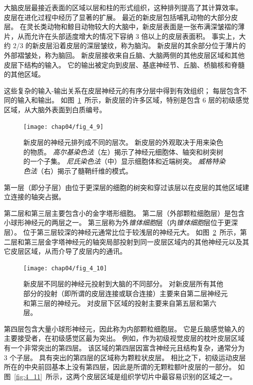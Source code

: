 大脑皮层最接近表面的区域以层和柱的形式组织，这种排列提高了其计算效率。 
皮层在进化过程中经历了显著的扩展。 
最近的新皮层包括哺乳动物的大部分皮层。 
在灵长类动物和鲸目动物较大的大脑中，新皮层表面是一张布满深皱褶的薄片，从而允许在头部适度增大的情况下容纳 3 倍以上的皮层表面积。
事实上，大约 2/3 的新皮层沿着皮层的深层皱纹，称为脑沟。
新皮层的其余部分位于薄片的外部褶皱处，称为脑回。 
新皮层接收来自丘脑、大脑两侧的其他皮层区域和其他皮层下结构的输入。 
它的输出被定向到皮层、基底神经节、丘脑、桥脑核和脊髓的其他区域。


这些复杂的输入-输出关系在皮层神经元的有序分层中得到有效组织； 每层包含不同的输入和输出。 
如图~\ref{fig:4_9}~所示，新皮层的许多区域，特别是包含 6 层的初级感觉区域，从大脑外表面到白质编号。

\begin{figure}[htbp]
	\centering
	\texttt{[image: chap04/fig\_4\_9]}
	\caption{新皮层的神经元排列成不同的层次。 
		新皮层的外观取决于用来染色的物质。 
		\textit{高尔基染色法}（左）揭示了神经元细胞体、轴突和树突树的一个子集。 
		\textit{尼氏染色法}（中）显示细胞体和近端树突。
		\textit{威格特染色法}（右）揭示了髓鞘纤维的模式\cite{heimer2012human}。}
	\label{fig:4_9}
\end{figure}


第一层（即分子层）由位于更深层的细胞的树突和穿过该层以在皮层的其他区域建立连接的轴突占据。


第二层和第三层主要包含小的金字塔形细胞。
第二层（外部颗粒细胞层）是包含小球形神经元的两层之一。
第三层称为外\textit{锥体细胞}层（内\textit{锥体细胞}层位于更深层）。
位于第三层较深的神经元通常比位于较浅层的神经元大。 
如图~\ref{fig:4_10}~所示，第二层和第三层金字塔神经元的轴突局部投射到同一皮层区域内的其他神经元以及其它皮层区域，从而介导了皮层内的通讯。

\begin{figure}[htbp]
	\centering
	\texttt{[image: chap04/fig\_4\_10]}
	\caption{新皮层不同层的神经元投射到大脑的不同部分。
		对新皮层所有其他部分的投射（即所谓的皮层连接或联合连接）主要来自第二层神经元和第三层的神经元。
		对皮层下区域的投射主要来自第五层和第六层\cite{jones1986connectivity}。}
	\label{fig:4_10}
\end{figure}


第四层包含大量小球形神经元，因此称为内部颗粒细胞层。 
它是丘脑感觉输入的主要接受者，在初级感觉区最为突出。 
例如，作为初级视觉皮层的枕叶皮层区域有一个非常突出的第四层。
该区域的第四层因富含神经元且结构复杂，通常分为 3 个子层。
具有突出的第四层的区域称为颗粒状皮层。 
相比之下，初级运动皮层所在的中央前回基本上没有第四层，因此是所谓的无颗粒额叶皮层的一部分。
如图~\ref{fig:4_11}~所示，这两个皮层区域是组织学切片中最容易识别的区域之一。

